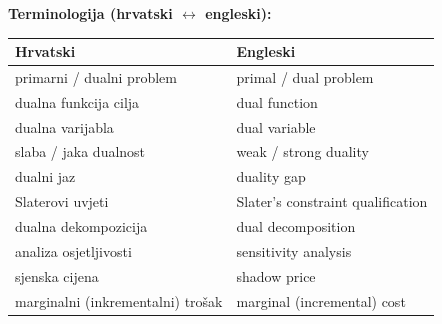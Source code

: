 \textbf{Terminologija (hrvatski $\leftrightarrow$ engleski):}

\begin{center}
\begin{tabular}{ll}
\toprule
\textbf{Hrvatski} & \textbf{Engleski} \\
\midrule
primarni / dualni problem & primal / dual problem \\
dualna funkcija cilja & dual function \\
dualna varijabla & dual variable \\
slaba / jaka dualnost & weak / strong duality \\
dualni jaz & duality gap \\
Slaterovi uvjeti & Slater's constraint qualification \\
dualna dekompozicija & dual decomposition \\
analiza osjetljivosti & sensitivity analysis \\
sjenska cijena & shadow price \\
marginalni (inkrementalni) trošak & marginal (incremental) cost \\
\bottomrule
\end{tabular}
\end{center}
